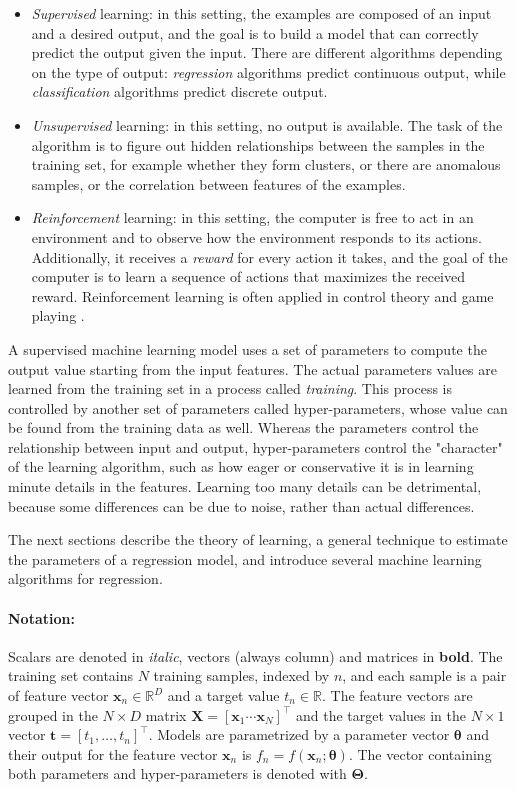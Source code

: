 \documentclass[a4paper,11pt]{kth-mag}
\begin{document}
\begin{itemize}
\item \emph{Supervised} learning: in this setting, the examples are composed of an input and a desired output, and the goal is to build a model that can correctly predict the output given the input. There are different algorithms depending on the type of output: \emph{regression} algorithms predict continuous output, while \emph{classification} algorithms predict discrete output.

\item \emph{Unsupervised} learning: in this setting, no output is available. The task of the algorithm is to figure out hidden relationships between the samples in the training set, for example whether they form clusters, or there are anomalous samples, or the correlation between features of the examples.

\item \emph{Reinforcement} learning: in this setting, the computer is free to act in an environment and to observe how the environment responds to its actions. Additionally, it receives a \emph{reward} for every action it takes, and the goal of the computer is to learn a sequence of actions that maximizes the received reward. Reinforcement learning is often applied in control theory \cite{rlcontrol} and game playing \citep{alphazero}.
\end{itemize}

A supervised machine learning model uses a set of parameters to compute the output value starting from the input features. The actual parameters values are learned from the training set in a process called \emph{training}. This process is controlled by another set of parameters called hyper-parameters, whose value can be found from the training data as well. Whereas the parameters control the relationship between input and output, hyper-parameters control the "character" of the learning algorithm, such as how eager or conservative it is in learning minute details in the features. Learning too many details can be detrimental, because some differences can be due to noise, rather than actual differences.

The next sections describe the theory of learning, a general technique to estimate the parameters of a regression model, and introduce several machine learning algorithms for regression.

\paragraph{Notation:} Scalars are denoted in \textit{italic}, vectors (always column) and matrices in \textbf{bold}. The training set contains $N$ training samples, indexed by $n$, and each sample is a pair of feature vector $\bm x_n\in\mathbb{R}^D$ and a target value $t_n\in\mathbb{R}$. The feature vectors are grouped in the $N\times D$ matrix $\bm X=\left[\bm x_1\dotsb\bm x_N\right]^\intercal$ and the target values in the $N\times 1$ vector $\bm t=\left[t_1,\ldots,t_n\right]^\intercal$. Models are parametrized by a parameter vector $\bm\theta$ and their output for the feature vector $\bm x_n$ is $f_n=f(\bm x_n;\bm\theta)$. The vector containing both parameters and hyper-parameters is denoted with $\bm\Theta$.
\end{document}
